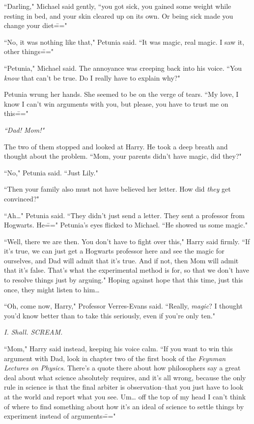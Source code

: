 ``Darling," Michael said gently, ``you got sick, you gained some weight while resting in bed, and your skin cleared up on its own. Or being sick made you change your diet\==="

``No, it was nothing like that," Petunia said. ``It was magic, real magic. I saw it, other things\==="

``Petunia," Michael said. The annoyance was creeping back into his voice. ``You \emph{know} that can't be true. Do I really have to explain why?"

Petunia wrung her hands. She seemed to be on the verge of tears. ``My love, I know I can't win arguments with you, but please, you have to trust me on this\==="

\emph{``Dad! Mom!"}

The two of them stopped and looked at Harry. He took a deep breath and thought about the problem. ``Mom, your parents didn't have magic, did they?"

``No," Petunia said. ``Just Lily."

``Then your family also must not have believed her letter. How did \emph{they} get convinced?"

``Ah{\ldots}" Petunia said. ``They didn't just send a letter. They sent a professor from Hogwarts. He\===" Petunia's eyes flicked to Michael. ``He showed us some magic."

``Well, there we are then. You don't have to fight over this," Harry said firmly. ``If it's true, we can just get a Hogwarts professor here and see the magic for ourselves, and Dad will admit that it's true. And if not, then Mom will admit that it's false. That's what the experimental method is for, so that we don't have to resolve things just by arguing." Hoping against hope that this time, just this once, they might listen to him{\ldots}

``Oh, come now, Harry," Professor Verres-Evans said. ``Really, \emph{magic}? I thought you'd know better than to take this seriously, even if you're only ten."

\emph{I. Shall. SCREAM.}

``Mom," Harry said instead, keeping his voice calm. ``If you want to win this argument with Dad, look in chapter two of the first book of the \emph{Feynman Lectures on Physics}. There's a quote there about how philosophers say a great deal about what science absolutely requires, and it's all wrong, because the only rule in science is that the final arbiter is observation\---that you just have to look at the world and report what you see. Um{\ldots} off the top of my head I can't think of where to find something about how it's an ideal of science to settle things by experiment instead of arguments\==="

